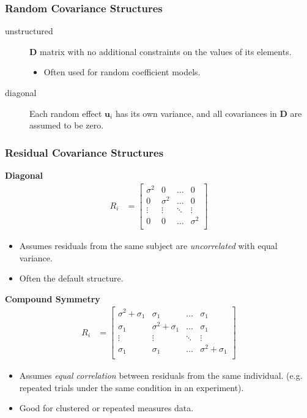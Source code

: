 \documentclass[english]{article}
\begin{document}
\begin{multicols*}{2}
\subsubsection{Random Covariance Structures}
\begin{description}
	\item[unstructured]	$\bm{D}$ matrix with no additional constraints on the values of its elements.
		\begin{itemize}
		\item	Often used for random coefficient models.
		\end{itemize}
	\item[diagonal]	Each random effect $\bm{u}_{i}$ has its own variance, and all covariances in $\bm{D}$ are assumed to be zero.
\end{description}


\subsubsection{Residual Covariance Structures}
\textbf{Diagonal}
\begin{align*}
	R_{i}
	&=	\begin{bmatrix}
		\sigma^{2}	&	0	&	\dots	&	0	\\
		0	&	\sigma^{2}	&	\dots	&	0	\\
		\vdots	&	\vdots	&	\ddots	&	\vdots	\\
		0	&	0	&	\dots	&	\sigma^{2}	\\
		\end{bmatrix}
\end{align*}
\begin{itemize}
	\item	Assumes residuals from the same subject are \textit{uncorrelated} with equal variance.
	\item	Often the default structure.	
\end{itemize}


\textbf{Compound Symmetry}
\begin{align*}
	R_{i}
	&=	\begin{bmatrix}
		\sigma^{2} + \sigma_{1}	&	\sigma_{1}	&	\dots	&	\sigma_{1}	\\
		\sigma_{1}	&	\sigma^{2} + \sigma_{1}	&	\dots	&	\sigma_{1}	\\
		\vdots	&	\vdots	&	\ddots	&	\vdots	\\
		\sigma_{1}	&	\sigma_{1}	&	\dots	&	\sigma^{2} + \sigma_{1}	\\
		\end{bmatrix}
\end{align*}
\begin{itemize}
	\item	Assumes \textit{equal correlation} between residuals from the same individual. (e.g. repeated trials under the same condition in an experiment).
	\item	Good for clustered or repeated measures data.
\end{itemize}



\end{multicols*}
\end{document}
